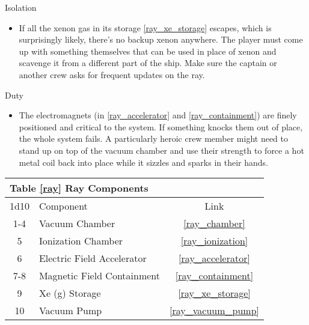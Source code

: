\documentclass[a4paper]{article}
\begin{document}
\begin{minipage}[t]{0.4\linewidth}
Isolation
\begin{itemize}
\item If all the xenon gas in its storage \ref{ray_xe_storage} escapes, which is surprisingly likely, there's no backup xenon anywhere. The player must come up with something themselves that can be used in place of xenon and scavenge it from a different part of the ship. Make sure the captain or another crew asks for frequent updates on the ray.
\end{itemize}
\end{minipage}
\begin{minipage}[t]{0.4\linewidth}
Duty
\begin{itemize}
\item The electromagnets (in \ref{ray_accelerator} and \ref{ray_containment}) are finely positioned and critical to the system. If something knocks them out of place, the whole system fails. A particularly heroic crew member might need to stand up on top of the vacuum chamber and use their strength to force a hot metal coil back into place while it sizzles and sparks in their hands.
\end{itemize}
\end{minipage}

\vspace{0.5cm} \hspace{0.25\linewidth}
\begin{tabular}{@{} | c | l | c | @{}}
\toprule
\multicolumn{3}{|l|}{Table \ref{ray} Ray Components} \\
\toprule
1d10 & Component & Link \\
\midrule
1-4 & Vacuum Chamber & \ref{ray_chamber} \\
5 & Ionization Chamber & \ref{ray_ionization} \\
6 & Electric Field Accelerator & \ref{ray_accelerator} \\
7-8 & Magnetic Field Containment & \ref{ray_containment} \\
9 & Xe (g) Storage & \ref{ray_xe_storage} \\
10 & Vacuum Pump & \ref{ray_vacuum_pump} \\
\bottomrule
\end{tabular}
\end{document}
